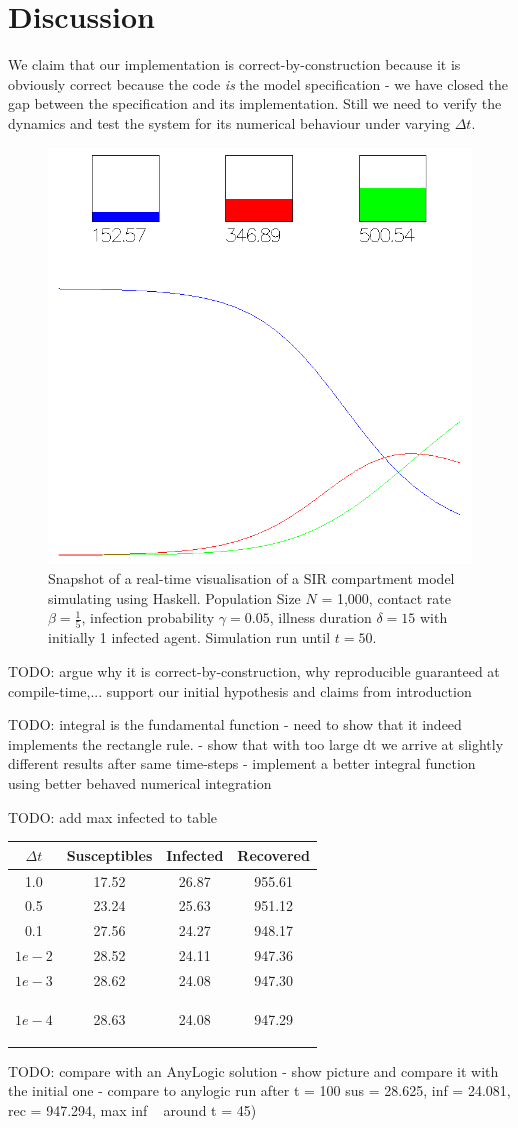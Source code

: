 \section{Discussion}
We claim that our implementation is correct-by-construction because it is obviously correct because the code \textit{is} the model specification - we have closed the gap between the specification and its implementation. Still we need to verify the dynamics and test the system for its numerical behaviour under varying $\Delta t$.

\begin{figure}
	\centering
	\includegraphics[width=.4\textwidth, angle=0]{./fig/visualisation_t50.png}
	\caption{Snapshot of a real-time visualisation of a SIR compartment model simulating using Haskell. Population Size $N$ = 1,000, contact rate $\beta =  \frac{1}{5}$, infection probability $\gamma = 0.05$, illness duration $\delta = 15$ with initially 1 infected agent. Simulation run until $t = 50$.}
	\label{fig:sir_sd_visualisation}
\end{figure}

TODO: argue why it is correct-by-construction, why reproducible guaranteed at compile-time,... support our initial hypothesis and claims from introduction

TODO: integral is the fundamental function
- need to show that it indeed implements the rectangle rule. 
- show that with too large dt we arrive at slightly different results after same time-steps
- implement a better integral function using better behaved numerical integration

TODO: add max infected to table

\begin{center}
  \begin{tabular}{ c || c | c | c  }
    $\Delta t$ & Susceptibles & Infected & Recovered \\ \hline \hline 
    1.0 & 17.52 & 26.87 & 955.61 \\ \hline
    0.5 & 23.24 & 25.63 & 951.12 \\ \hline
    0.1 & 27.56 & 24.27 & 948.17 \\ \hline
    $1e-2$ & 28.52 & 24.11 & 947.36 \\ \hline
    $1e-3$ & 28.62 & 24.08 & 947.30 \\ \hline
    $1e-4$ & 28.63 & 24.08 & 947.29
    
    \label{tab:delta_influence}
  \end{tabular}
\end{center}

TODO: compare with an AnyLogic solution
- show picture and compare it with the initial one
- compare to anylogic run after t = 100 sus = 28.625, inf = 24.081, rec = 947.294, max inf ~ around t = 45)
